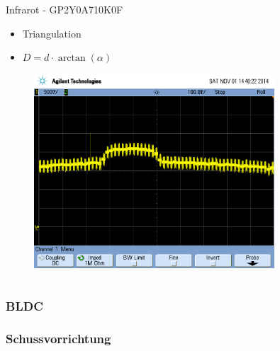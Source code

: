 \begin{frame}
\begin{columns}
\begin{column}{0.5\textwidth}
            \begin{block}{Infrarot - GP2Y0A710K0F}
                \begin{itemize}
                    \item Triangulation
                    \item $D = d \cdot \arctan(\alpha)$
                \end{itemize}
                \pause
                \begin{figure}
                    \includegraphics[width=0.8\textwidth]{../doc/fig/scope_82.png}
                \end{figure}
            \end{block}
        \end{column}
    \end{columns}
\end{frame}

\begin{frame}
    \frametitle{BLDC}
\end{frame}

\begin{frame}
    \frametitle{Schussvorrichtung}
\end{frame}
